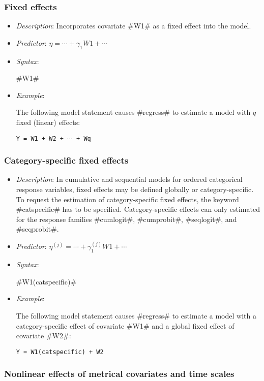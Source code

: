 \subsubsection*{Fixed effects}

\begin{itemize}
\item[] {\em Description}: Incorporates covariate #W1# as a fixed effect into the model.
\item[] {\em Predictor}: $\eta =  \cdots + \gamma_1 W1 + \cdots$
\item[] {\em Syntax}:

#W1#
\item[] {\em Example}:

The following model statement causes #regress# to estimate a model
with $q$ fixed (linear) effects:

\texttt{Y = W1 + W2 + $\cdots$ + Wq}
\end{itemize}

\subsubsection*{Category-specific fixed effects}

\begin{itemize}
\item[] {\em Description}: In cumulative and sequential models for
ordered categorical response variables, fixed effects may be defined
globally or category-specific. To request the estimation of
category-specific fixed effects, the keyword #catspecific# has to be
specified. Category-specific effects can only estimated for the
response families #cumlogit#, #cumprobit#, #seqlogit#, and
#seqprobit#.
\item[] {\em Predictor}: $\eta^{(j)} =  \cdots + \gamma_1^{(j)} W1 + \cdots$
\item[] {\em Syntax}:

#W1(catspecific)#
\item[] {\em Example}:

The following model statement causes #regress# to estimate a model
with a category-specific effect of covariate #W1# and a global fixed
effect of covariate #W2#:

\texttt{Y = W1(catspecific) + W2}
\end{itemize}

\subsubsection*{Nonlinear effects of metrical covariates and time
scales}

